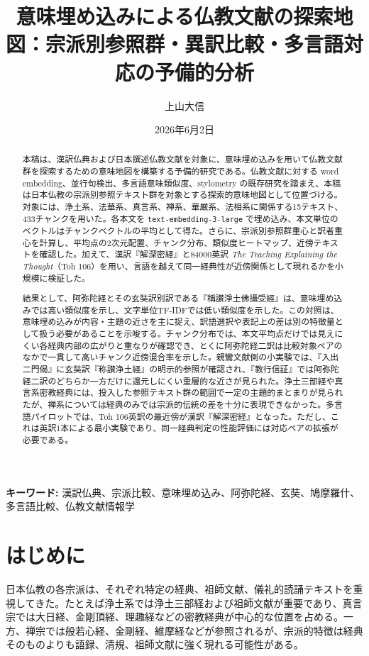 \documentclass[uplatex,dvipdfmx,11pt,a4paper]{jsarticle}
\title{意味埋め込みによる仏教文献の探索地図：宗派別参照群・異訳比較・多言語対応の予備的分析}
\author{上山大信}
\date{2026年6月2日}
\begin{document}
\maketitle

\begin{abstract}
本稿は、漢訳仏典および日本撰述仏教文献を対象に、意味埋め込みを用いて仏教文献群を探索するための意味地図を構築する予備的研究である。仏教文献に対する word embedding、並行句検出、多言語意味類似度、stylometry の既存研究を踏まえ、本稿は日本仏教の宗派別参照テキスト群を対象とする探索的意味地図として位置づける。対象には、浄土系、法華系、真言系、禅系、華厳系、法相系に関係する15テキスト、433チャンクを用いた。各本文を \texttt{text-embedding-3-large} で埋め込み、本文単位のベクトルはチャンクベクトルの平均として得た。さらに、宗派別参照群重心と訳者重心を計算し、平均点の2次元配置、チャンク分布、類似度ヒートマップ、近傍テキストを確認した。加えて、漢訳『解深密経』と84000英訳 \textit{The Teaching Explaining the Thought}（Toh 106）を用い、言語を越えて同一経典性が近傍関係として現れるかを小規模に検証した。

結果として、阿弥陀経とその玄奘訳別訳である『稱讃淨土佛攝受經』は、意味埋め込みでは高い類似度を示し、文字単位TF-IDFでは低い類似度を示した。この対照は、意味埋め込みが内容・主題の近さを主に捉え、訳語選択や表記上の差は別の特徴量として扱う必要があることを示唆する。チャンク分布では、本文平均点だけでは見えにくい各経典内部の広がりと重なりが確認でき、とくに阿弥陀経二訳は比較対象ペアのなかで一貫して高いチャンク近傍混合率を示した。親鸞文献側の小実験では、『入出二門偈』に玄奘訳『称讃浄土経』の明示的参照が確認され、『教行信証』では阿弥陀経二訳のどちらか一方だけに還元しにくい重層的な近さが見られた。浄土三部経や真言系密教経典には、投入した参照テキスト群の範囲で一定の主題的まとまりが見られたが、禅系については経典のみでは宗派的伝統の差を十分に表現できなかった。多言語パイロットでは、Toh 106英訳の最近傍が漢訳『解深密経』となった。ただし、これは英訳1本による最小実験であり、同一経典判定の性能評価には対応ペアの拡張が必要である。
\end{abstract}

\noindent\textbf{キーワード:} 漢訳仏典、宗派比較、意味埋め込み、阿弥陀経、玄奘、鳩摩羅什、多言語比較、仏教文献情報学

\section{はじめに}

日本仏教の各宗派は、それぞれ特定の経典、祖師文献、儀礼的読誦テキストを重視してきた。たとえば浄土系では浄土三部経および祖師文献が重要であり、真言宗では大日経、金剛頂経、理趣経などの密教経典が中心的な位置を占める。一方、禅宗では般若心経、金剛経、維摩経などが参照されるが、宗派的特徴は経典そのものよりも語録、清規、祖師文献に強く現れる可能性がある。
\end{document}
